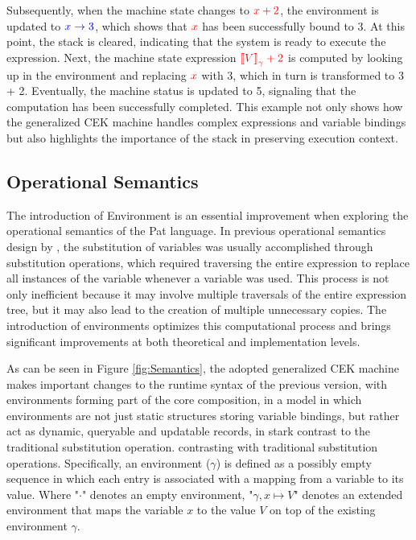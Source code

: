 \documentclass{l4proj}
\begin{document}
Subsequently, when the machine state changes to $\color{red}x + 2$, the environment is updated to $\color{blue}x \rightarrow 3$, which shows that $\color{red}x$ has been successfully bound to {\color{red}3}. At this point, the stack is cleared, indicating that the system is ready to execute the expression. Next, the machine state expression $\color{red}\text{\textlbrackdbl} V \text{\textrbrackdbl}_{\gamma} + 2$ is computed by looking up in the environment and replacing $\color{red}x$ with {\color{red}3}, which in turn is transformed to {\color{red}3} + {\color{red}2}. Eventually, the machine status is updated to {\color{red}5}, signaling that the computation has been successfully completed. This example not only shows how the generalized CEK machine handles complex expressions and variable bindings but also highlights the importance of the stack in preserving execution context. 

\subsection{Operational Semantics}

The introduction of Environment is an essential improvement when exploring the operational semantics of the Pat language. In previous operational semantics design by \cite{fowler_2023_special}, the substitution of variables was usually accomplished through substitution operations, which required traversing the entire expression to replace all instances of the variable whenever a variable was used. This process is not only inefficient because it may involve multiple traversals of the entire expression tree, but it may also lead to the creation of multiple unnecessary copies. The introduction of environments optimizes this computational process and brings significant improvements at both theoretical and implementation levels.

As can be seen in Figure \ref{fig:Semantics}, the adopted generalized CEK machine makes important changes to the runtime syntax of the previous version, with environments forming part of the core composition, in a model in which environments are not just static structures storing variable bindings, but rather act as dynamic, queryable and updatable records, in stark contrast to the traditional substitution operation. contrasting with traditional substitution operations. Specifically, an environment ($\gamma$) is defined as a possibly empty sequence in which each entry is associated with a mapping from a variable to its value. Where "$\cdot$" denotes an empty environment, "$\gamma, x \mapsto V$" denotes an extended environment that maps the variable $x$ to the value $V$ on top of the existing environment $\gamma$.
\end{document}
